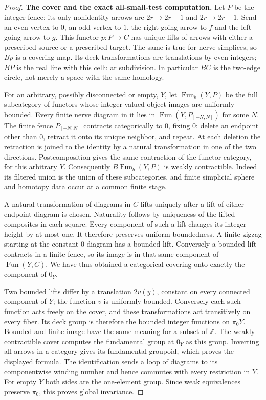 \begin{proof}
\textbf{The cover and the exact all-small-test computation.}
Let $P$ be the integer fence: its only nonidentity arrows are
$2r\to2r-1$ and $2r\to2r+1$. Send an even vertex to $0$, an odd
vertex to $1$, the right-going arrow to $f$ and the left-going arrow
to $g$. This functor $p:P\to C$ has unique lifts of arrows with
either a prescribed source or a prescribed target. The same is
true for nerve simplices, so $Bp$ is a covering map. Its deck
transformations are translations by even integers; $BP$ is the
real line with this cellular subdivision. In particular $BC$ is
the two-edge circle, not merely a space with the same homology.

For an arbitrary, possibly disconnected or empty, $Y$, let
$\operatorname{Fun}_b(Y,P)$ be the full subcategory of functors
whose integer-valued object images are uniformly bounded. Every
finite nerve diagram in it lies in
$\operatorname{Fun}(Y,P_{[-N,N]})$ for some $N$. The finite fence
$P_{[-N,N]}$ contracts categorically to $0$, fixing $0$: delete an
endpoint other than $0$, retract it onto its unique neighbor, and
repeat. At each deletion the retraction is joined to the identity
by a natural transformation in one of the two directions.
Postcomposition gives the same contraction of the functor category,
for this arbitrary $Y$. Consequently
$B\operatorname{Fun}_b(Y,P)$ is weakly contractible. Indeed its
filtered union is the union of these subcategories, and finite
simplicial sphere and homotopy data occur at a common finite stage.

A natural transformation of diagrams in $C$ lifts uniquely after a
lift of either endpoint diagram is chosen. Naturality follows by
uniqueness of the lifted composites in each square. Every component
of such a lift changes its integer height by at most one. It
therefore preserves uniform boundedness. A finite zigzag starting
at the constant $0$ diagram has a bounded lift. Conversely a bounded
lift contracts in a finite fence, so its image is in that same
component of $\operatorname{Fun}(Y,C)$. We have thus obtained a
categorical covering onto exactly the component of $0_Y$.

Two bounded lifts differ by a translation $2v(y)$, constant on
every connected component of $Y$; the function $v$ is uniformly
bounded. Conversely each such function acts freely on the cover,
and these transformations act transitively on every fiber. Its
deck group is therefore the bounded integer functions on $\pi_0Y$.
Bounded and finite-image have the same meaning for a subset of
$\mathbb Z$. The weakly contractible cover computes the fundamental
group at $0_Y$ as this group. Inverting all arrows in a category
gives its fundamental groupoid, which proves the displayed formula.
The identification sends a loop of diagrams to its componentwise
winding number and hence commutes with every restriction in $Y$.
For empty $Y$ both sides are the one-element group. Since weak
equivalences preserve $\pi_0$, this proves global invariance.


\end{proof}
